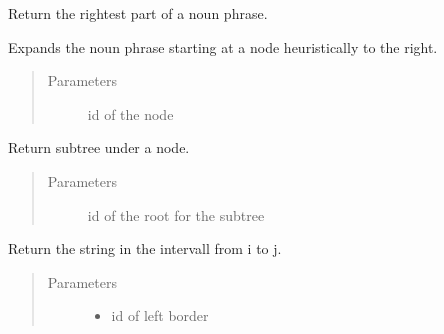 \documentclass[letterpaper,10pt,english]{sphinxmanual}
\begin{document}
\begin{fulllineitems}
\begin{fulllineitems}
\begin{quote}
\begin{description}
\end{description}\end{quote}

\end{fulllineitems}


\begin{fulllineitems}
\label{\detokenize{api:conll_parser.Tree.get_rightest_noun_part}}
Return the rightest part of a noun phrase.

Expands the noun phrase starting at a node heuristically to
the right.
\begin{quote}\begin{description}
\item[{Parameters}] \leavevmode
{} \textendash{} id of the node

\end{description}\end{quote}

\end{fulllineitems}


\begin{fulllineitems}
\label{\detokenize{api:conll_parser.Tree.get_subtree}}
Return subtree under a node.
\begin{quote}\begin{description}
\item[{Parameters}] \leavevmode
{} \textendash{} id of the root for the subtree

\end{description}\end{quote}

\end{fulllineitems}


\begin{fulllineitems}
\label{\detokenize{api:conll_parser.Tree.string_from_to}}
Return the string in the intervall from i to j.
\begin{quote}\begin{description}
\item[{Parameters}] \leavevmode\begin{itemize}
\item {} 
 \textendash{} id of left border


\end{itemize}
\end{description}
\end{quote}
\end{fulllineitems}
\end{fulllineitems}
\end{document}
